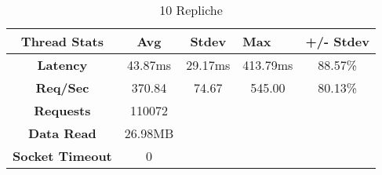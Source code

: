 \begin{table}[H]
\caption{10 Repliche}
\centering
\begin{tabular}{|c|c|ccc}
\hline
\textbf{Thread Stats}   & \textbf{Avg} & \multicolumn{1}{c|}{\textbf{Stdev}} & \multicolumn{1}{l|}{\textbf{Max}} & \multicolumn{1}{l|}{\textbf{+/- Stdev}} \\ \hline
\textbf{Latency}        & 43.87ms      & \multicolumn{1}{c|}{29.17ms}        & \multicolumn{1}{c|}{413.79ms}     & \multicolumn{1}{c|}{88.57\%}            \\ \hline
\textbf{Req/Sec}        & 370.84       & \multicolumn{1}{c|}{74.67}          & \multicolumn{1}{c|}{545.00}       & \multicolumn{1}{c|}{80.13\%}            \\ \hline
\textbf{Requests}       & 110072       &                                     &                                   &                                         \\ \cline{1-2}
\textbf{Data Read}      & 26.98MB      &                                     &                                   &                                         \\ \cline{1-2}
\textbf{Socket Timeout} & 0            &                                     &                                   &                                         \\ \cline{1-2}
\end{tabular}
\end{table}